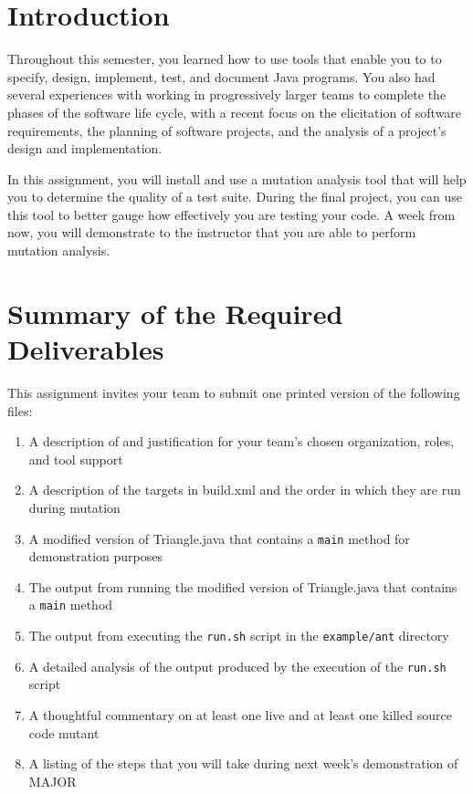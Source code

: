 

\usepackage[compact]{titlesec}



\section*{Introduction} 

Throughout this semester, you learned how to use tools that enable you to to specify, design, implement,
test, and document Java programs.  You also had several experiences with working in progressively larger teams to
complete the phases of the software life cycle, with a recent focus on the elicitation of software requirements, the
planning of software projects, and the analysis of a project's design and implementation.  


In this assignment, you will
install and use a mutation analysis tool that will help you to determine the quality of a test suite.  During the final
project, you can use this tool to better gauge how effectively you are testing your code. A week from now, you will
demonstrate to the instructor that you are able to perform mutation analysis.

\section*{Summary of the Required Deliverables}

This assignment invites your team to submit one printed version of the following files:
\vspace*{-.1in}
\begin{enumerate}
	\itemsep0em 
	\item A description of and justification for your team's chosen organization, roles, and tool support
	\item A description of the targets in build.xml and the order in which they are run during mutation 
	\item A modified version of Triangle.java that contains a {\tt main} method for demonstration purposes
	\item The output from running the modified version of Triangle.java that contains a {\tt main} method
	\item The output from executing the {\tt run.sh} script in the {\tt example/ant} directory
	\item A detailed analysis of the output produced by the execution of the {\tt run.sh} script
	\item A thoughtful commentary on at least one live and at least one killed source code mutant
	\item A listing of the steps that you will take during next week's demonstration of MAJOR
\end{enumerate}
\vspace*{-.1in}


